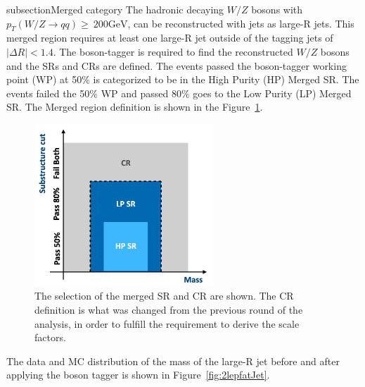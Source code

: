 subsection{Merged category}
The hadronic decaying $W/Z$ bosons with $p_{T}(W / Z \rightarrow q q) \geq ~200 \mathrm{GeV}$, can be reconstructed with jets as large-R jets. This merged region requires at least one large-R jet outside of the tagging jets of $|\Delta R|<1.4$. 
The boson-tagger is required to find the reconstructed $W/Z$ bosons and the SRs and CRs are defined. The events passed the boson-tagger working point (WP) at 50$\%$ is categorized to be in the High Purity (HP) Merged SR. The events failed the 50$\%$ WP and passed 80$\%$ goes to the Low Purity (LP) Merged SR. 
The Merged region definition is shown in the Figure~\ref{fig:MergedRegion}.
\begin{figure}[H]
    \centering
    \includegraphics[width=0.6\textwidth]{figures/MergedRegion}
    \caption{The selection of the merged SR and CR are shown. The CR definition is what was changed from the previous round of the analysis, in order to fulfill the requirement to derive the scale factors.}
    \label{fig:MergedRegion}
\end{figure}
The data and MC distribution of the mass of the large-R jet before and after applying the boson tagger is shown in Figure~\ref{fig:2lepfatJet}.
